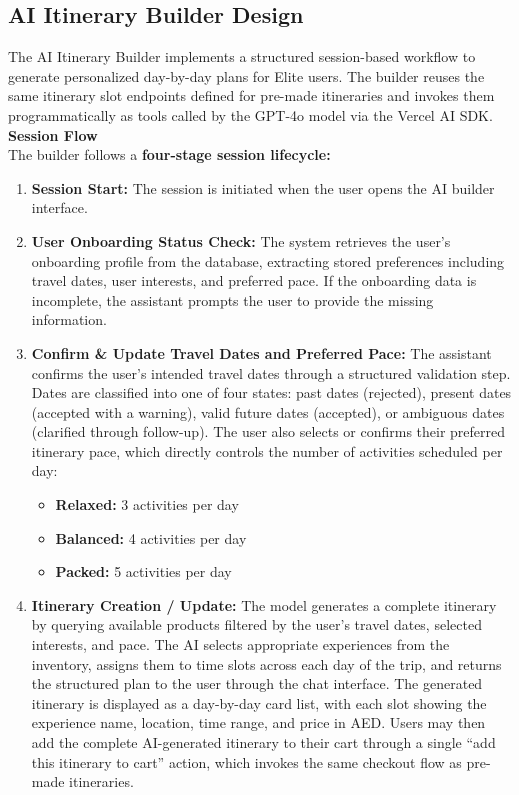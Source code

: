 \subsection{AI Itinerary Builder Design}
\label{subsection:AI Itinerary Builder Design}
The AI Itinerary Builder implements a structured session-based workflow to generate personalized day-by-day plans for Elite users. The builder reuses the same itinerary slot endpoints defined for pre-made itineraries and invokes them programmatically as tools called by the GPT-4o model via the Vercel AI SDK. \\
\textbf{Session Flow} \\
The builder follows a \textbf{four-stage session lifecycle:}
\begin{enumerate}
    \item \textbf{Session Start:} The session is initiated when the user opens the AI builder interface.
    \item \textbf{User Onboarding Status Check:} The system retrieves the user's onboarding profile from the database, extracting stored preferences including travel dates, user interests, and preferred pace. If the onboarding data is incomplete, the assistant prompts the user to provide the missing information.
    \item \textbf{Confirm \& Update Travel Dates and Preferred Pace:} The assistant confirms the user's intended travel dates through a structured validation step. Dates are classified into one of four states: past dates (rejected), present dates (accepted with a warning), valid future dates (accepted), or ambiguous dates (clarified through follow-up). The user also selects or confirms their preferred itinerary pace, which directly controls the number of activities scheduled per day:
    \begin{itemize}
        \item \textbf{Relaxed:} 3 activities per day
        \item \textbf{Balanced:} 4 activities per day
        \item \textbf{Packed:} 5 activities per day
    \end{itemize}
    \item \textbf{Itinerary Creation / Update:} The model generates a complete itinerary by querying available products filtered by the user's travel dates, selected interests, and pace. The AI selects appropriate experiences from the inventory, assigns them to time slots across each day of the trip, and returns the structured plan to the user through the chat interface. The generated itinerary is displayed as a day-by-day card list, with each slot showing the experience name, location, time range, and price in AED. Users may then add the complete AI-generated itinerary to their cart through a single ``add this itinerary to cart'' action, which invokes the same checkout flow as pre-made itineraries.
\end{enumerate}

